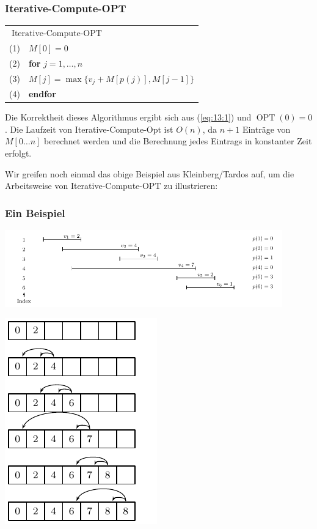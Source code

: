 \documentclass[smaller]{beamer}
\DeclareMathOperator{\opt}{OPT}
\DeclareMathOperator{\icopt}{Iterative-Compute-OPT}
\begin{document}
\begin{frame}
 \frametitle{Iterative-Compute-OPT}
 \begin{center}
\begin{tabular}{rl}
\multicolumn{2}{l}{$\mathbf{\icopt}$} \\
 (1)& $M[0] = 0$ \\
 (2)& \textbf{for} $j=1,\ldots,n$ \\
 (3)& \qquad $M[j] = \max\{ v_j + M[p(j)], M[j-1] \}$ \\
 (4)& \textbf{endfor}
\end{tabular}
\end{center} \medskip

Die \alert{Korrektheit} dieses Algorithmus ergibt sich aus (\ref{eq:13:1}) und $\opt{(0)}=0$. Die \alert{Laufzeit} von Iterative-Compute-Opt ist $O(n)$, da $n+1$ Einträge von $M[0 \ldots n]$ berechnet werden und die Berechnung jedes Eintrags in konstanter Zeit erfolgt. \\ \medskip

Wir greifen noch einmal das obige Beispiel aus Kleinberg/Tardos auf, um die Arbeitsweise von Iterative-Compute-OPT zu illustrieren:
\end{frame}

\begin{frame}
 \frametitle{Ein Beispiel}
 \begin{center}
  \includegraphics[width = 0.9\textwidth]{fig91.pdf}
 \end{center}
 
 \begin{center}
  \includegraphics[scale=0.8]{fig92.pdf}
 \end{center}

\end{frame}
\end{document}
